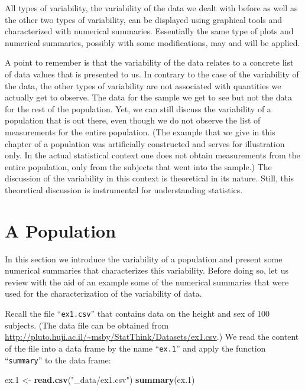 \documentclass[]{krantz}
\makeatletter
\newenvironment{Shaded}{\begin{snugshade}}{\end{snugshade}}
\newcommand{\KeywordTok}[1]{\textcolor[rgb]{0.13,0.29,0.53}{\textbf{#1}}}
\newcommand{\DecValTok}[1]{\textcolor[rgb]{0.00,0.00,0.81}{#1}}
\newcommand{\StringTok}[1]{\textcolor[rgb]{0.31,0.60,0.02}{#1}}
\newcommand{\NormalTok}[1]{#1}
\newenvironment{kframe}{%
\medskip{}
\setlength{\fboxsep}{.8em}
 \def\at@end@of@kframe{}%
 \ifinner\ifhmode%
  \def\at@end@of@kframe{\end{minipage}}%
  \begin{minipage}{\columnwidth}%
 \fi\fi%
 \def\FrameCommand##1{\hskip\@totalleftmargin \hskip-\fboxsep
 \colorbox{shadecolor}{##1}\hskip-\fboxsep
     \hskip-\linewidth \hskip-\@totalleftmargin \hskip\columnwidth}%
 \MakeFramed {\advance\hsize-\width
   \@totalleftmargin\z@ \linewidth\hsize
   \@setminipage}}%
 {\par\unskip\endMakeFramed%
 \at@end@of@kframe}
\renewenvironment{Shaded}{\begin{kframe}}{\end{kframe}}
\theoremstyle{definition}
\theoremstyle{definition}
\theoremstyle{definition}
\theoremstyle{remark}
\makeatother
\begin{document}
All types of variability, the variability of the data we dealt with
before as well as the other two types of variability, can be displayed
using graphical tools and characterized with numerical summaries.
Essentially the same type of plots and numerical summaries, possibly
with some modifications, may and will be applied.

A point to remember is that the variability of the data relates to a
concrete list of data values that is presented to us. In contrary to the
case of the variability of the data, the other types of variability are
not associated with quantities we actually get to observe. The data for
the sample we get to see but not the data for the rest of the
population. Yet, we can still discuss the variability of a population
that is out there, even though we do not observe the list of
measurements for the entire population. (The example that we give in
this chapter of a population was artificially constructed and serves for
illustration only. In the actual statistical context one does not obtain
measurements from the entire population, only from the subjects that
went into the sample.) The discussion of the variability in this context
is theoretical in its nature. Still, this theoretical discussion is
instrumental for understanding statistics.

\section{A Population}\label{a-population}

In this section we introduce the variability of a population and present
some numerical summaries that characterizes this variability. Before
doing so, let us review with the aid of an example some of the numerical
summaries that were used for the characterization of the variability of
data.

Recall the file ``\texttt{ex1.csv}'' that contains data on the height
and sex of 100 subjects. (The data file can be obtained from
\url{http://pluto.huji.ac.il/~msby/StatThink/Datasets/ex1.csv}.) We read
the content of the file into a data frame by the name ``\texttt{ex.1}''
and apply the function ``\texttt{summary}'' to the data frame:

\begin{Shaded}
\begin{Highlighting}[]
\NormalTok{ex.}\DecValTok{1}\NormalTok{ <-}\StringTok{ }\KeywordTok{read.csv}\NormalTok{(}\StringTok{"_data/ex1.csv"}\NormalTok{)}
\KeywordTok{summary}\NormalTok{(ex.}\DecValTok{1}\NormalTok{)}
\end{Highlighting}
\end{Shaded}
\end{document}
